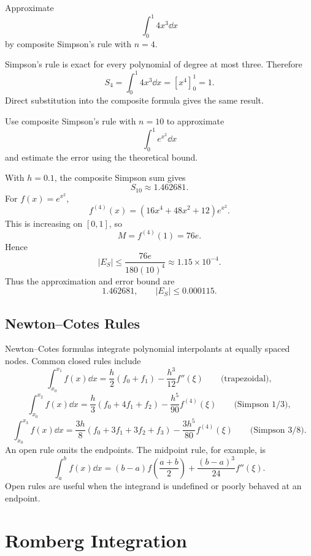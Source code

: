 \begin{example}
Approximate
\[
 \int_0^1 4x^3\dd x
\]
by composite Simpson's rule with $n=4$.
\end{example}

\begin{solution}[3.5cm]
Simpson's rule is exact for every polynomial of degree at most three.  Therefore
\[
 S_4=\int_0^1 4x^3\dd x=[x^4]_0^1=1.
\]
Direct substitution into the composite formula gives the same result.
\end{solution}

\begin{example}
Use composite Simpson's rule with $n=10$ to approximate
\[
 \int_0^1 e^{x^2}\dd x
\]
and estimate the error using the theoretical bound.
\end{example}

\begin{solution}[5.5cm]
With $h=0.1$, the composite Simpson sum gives
\[
 S_{10}\approx1.462681.
\]
For $f(x)=e^{x^2}$,
\[
 f^{(4)}(x)=(16x^4+48x^2+12)e^{x^2}.
\]
This is increasing on $[0,1]$, so
\[
 M=f^{(4)}(1)=76e.
\]
Hence
\[
 |E_S|
 \le\frac{76e}{180(10)^4}
 \approx1.15\times10^{-4}.
\]
Thus the approximation and error bound are
\[
 1.462681,
 \qquad |E_S|\le0.000115.
\]
\end{solution}

\subsection{Newton--Cotes Rules}

Newton--Cotes formulas integrate polynomial interpolants at equally spaced nodes.  Common closed rules include
\[
 \int_{x_0}^{x_1}f(x)\dd x
 =\frac h2(f_0+f_1)-\frac{h^3}{12}f''(\xi)
 \qquad\text{(trapezoidal)},
\]
\[
 \int_{x_0}^{x_2}f(x)\dd x
 =\frac h3(f_0+4f_1+f_2)-\frac{h^5}{90}f^{(4)}(\xi)
 \qquad\text{(Simpson $1/3$)},
\]
\[
 \int_{x_0}^{x_3}f(x)\dd x
 =\frac{3h}{8}(f_0+3f_1+3f_2+f_3)
 -\frac{3h^5}{80}f^{(4)}(\xi)
 \qquad\text{(Simpson $3/8$)}.
\]
An open rule omits the endpoints.  The midpoint rule, for example, is
\[
 \int_a^b f(x)\dd x
 =(b-a)f\left(\frac{a+b}{2}\right)
 +\frac{(b-a)^3}{24}f''(\xi).
\]
Open rules are useful when the integrand is undefined or poorly behaved at an endpoint.

\section{Romberg Integration}

